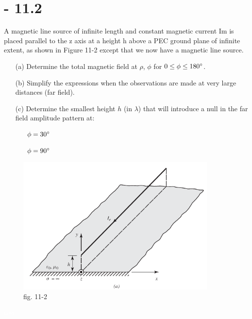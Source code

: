 \documentclass[12pt]{article}
\begin{document}
\section{- 11.2}
A magnetic line source of infinite length and constant magnetic current Im is placed parallel to the z axis at a height h above a PEC ground plane of infinite extent, as shown in Figure 11-2 except that we now have a magnetic line source.
\begin{itemize}
\item[(a)] Determine the total magnetic field at $\rho$, $\phi$ for $0\le \phi \le 180\degree$.
\item[(b)] Simplify the expressions when the observations are made at very large distances (far field).
\item[(c)] Determine the smallest height $h$ (in $\lambda$) that will introduce a null in the far field amplitude pattern at:
  \begin{itemize}
  \item[\cdot] $\phi = 30\degree$
  \item[\cdot] $\phi = 90\degree$
  \end{itemize}
\end{itemize}
\begin{center}
\begin{figure}[h]
    \centering
    \includegraphics[width=10cm]{./images/fig11-2.png}
    \caption{fig. 11-2}
    \label{fig:11-2}
  \end{figure}
\end{center}

\newpage
\textcolor{white}{test}
\newpage
\end{document}
